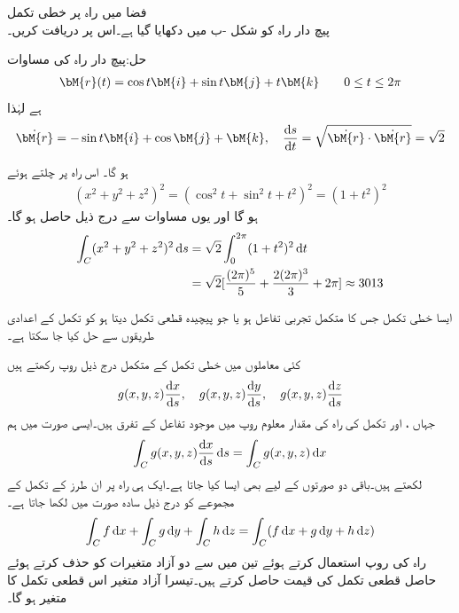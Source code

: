 \quad فضا میں راہ پر خطی تکمل\\
پیچ دار راہ کو شکل -ب میں دکھایا گیا ہے۔اس پر  دریافت کریں۔

حل:پیچ دار راہ کی مساوات 
\begin{align*}
\bM{r}(t)=\cos t\bM{i}+\sin t\bM{j}+t\bM{k}\quad \quad 0\le t \le 2\pi
\end{align*}
ہے لہٰذا
\begin{align*}
 \dot{\bM{r}}=-\sin t\bM{i}+\cos \bM{j}+\bM{k},\quad \frac{\dif s}{\dif t}=\sqrt{\dot{\bM{r}}\cdot \dot{\bM{r}}}=\sqrt{2}
\end{align*}

 ہو گا۔  اس راہ پر چلتے ہوئے 
\begin{align*}
(x^2+y^2+z^2)^2=(\cos^2 t+\sin^2 t+t^2)^2=(1+t^2)^2
\end{align*}
ہو گا اور یوں مساوات  سے درج ذیل حاصل ہو گا۔
\begin{align*}
\int_C (x^2+y^2+z^2)^2\dif s&=\sqrt{2}\int_0^{2\pi} (1+t^2)^2\dif t\\
&=\sqrt{2}[\frac{(2\pi)^5}{5}+\frac{2(2\pi)^3}{3}+2\pi]\approx 3013
\end{align*}

ایسا خطی تکمل جس کا متکمل تجربی تفاعل ہو یا جو پیچیدہ قطعی تکمل دیتا ہو کو تکمل کے اعدادی طریقوں سے حل کیا جا سکتا ہے۔   

کئی معاملوں میں خطی تکمل کے متکمل درج ذیل روپ رکھتے ہیں
\begin{align}
g(x,y,z)\frac{\dif x}{\dif s},\quad g(x,y,z)\frac{\dif y}{\dif s},\quad g(x,y,z)\frac{\dif z}{\dif s}
\end{align}
جہاں ،  اور  تکمل کی راہ کی مقدار معلوم روپ میں موجود تفاعل کے تفرق ہیں۔ایسی صورت میں ہم
\begin{align}\label{مساوات_خطی_تکمل_کئی_آزاد_الف}
\int_C g(x,y,z)\frac{\dif x}{\dif s}\dif s=\int_C g(x,y,z)\dif x
\end{align}
لکھتے ہیں۔باقی دو صورتوں کے لیے بھی ایسا کیا جاتا ہے۔ایک ہی راہ  پر ان طرز کے تکمل کے مجموعے کو درج ذیل سادہ صورت میں لکھا جاتا ہے۔
\begin{align}\label{مساوات_خطی_تکمل_کئی_آزاد_ب}
\int_C f\dif x+\int_C g\dif y+\int_C h\dif z=\int_C (f\dif x+g\dif y+h\dif z)
\end{align}
راہ  کی روپ استعمال کرتے ہوئے تین میں سے دو آزاد متغیرات کو حذف کرتے ہوئے حاصل قطعی تکمل کی قیمت حاصل کرتے ہیں۔تیسرا آزاد متغیر اس قطعی تکمل کا متغیر ہو گا۔

